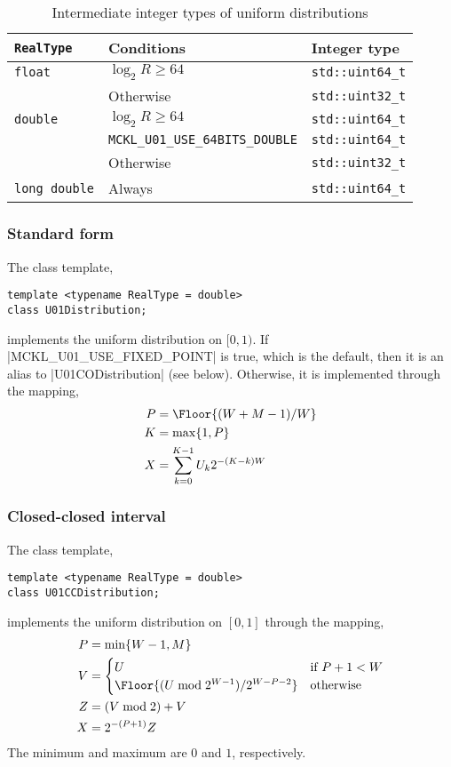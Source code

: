 \begin{table}
  \begin{tabularx}{\textwidth}{LlL}
    \toprule
    \texttt{RealType} & Conditions & Integer type \\
    \midrule
    \texttt{float}  & $\log_2 R \ge 64$ & \texttt{std::uint64\_t} \\
                    & Otherwise         & \texttt{std::uint32\_t} \\
    \texttt{double} & $\log_2 R \ge 64$ & \texttt{std::uint64\_t} \\
    & \texttt{MCKL\_U01\_USE\_64BITS\_DOUBLE} & \texttt{std::uint64\_t} \\
    & Otherwise & \texttt{std::uint32\_t} \\
    \texttt{long double} & Always & \texttt{std::uint64\_t} \\
    \bottomrule
  \end{tabularx}
  \caption{Intermediate integer types of uniform distributions}
  \label{tab:Intermediate integer types of uniform distributions}
\end{table}

\subsubsection{Standard form}

The class template,
\begin{Verbatim}
template <typename RealType = double>
class U01Distribution;
\end{Verbatim}
implements the uniform distribution on $[0, 1)$. If |MCKL_U01_USE_FIXED_POINT|
is true, which is the default, then it is an alias to |U01CODistribution| (see
below). Otherwise, it is implemented through the mapping,
\begin{align*}
  P &= \Floor{(W + M - 1) / W} \\
  K &= \max\{1, P\} \\
  X &= \sum_{k=0}^{K - 1} U_k 2^{-(K - k)W}
\end{align*}

\subsubsection{Closed-closed interval}

The class template,
\begin{Verbatim}
template <typename RealType = double>
class U01CCDistribution;
\end{Verbatim}
implements the uniform distribution on $[0, 1]$ through the mapping,
\begin{align*}
  P &= \min\{W - 1, M\} \\
  V &= \begin{cases}
    U &\text{if } P + 1 < W \\
    \Floor{(U \bmod 2^{W - 1}) / 2^{W - P -2}} &\text{otherwise}
  \end{cases} \\
  Z &= (V \bmod 2) + V \\
  X &= 2^{-(P + 1)} Z
\end{align*}
The minimum and maximum are $0$ and $1$, respectively.

